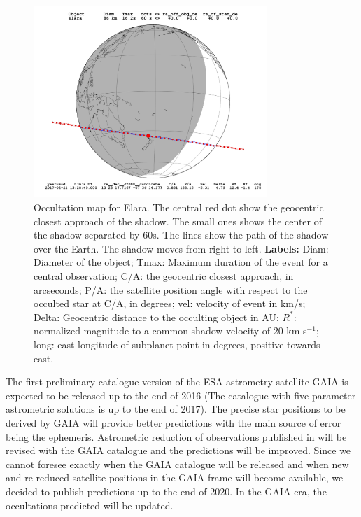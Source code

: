 \documentclass[useAMS,usenatbib]{mn2e}
\begin{document}
\begin{figure}
\begin{centering}
\includegraphics[width = 8.8cm]{figures/Elara_2017-02-21T15:28:40.png}   
\caption{Occultation map for Elara. %
The central red dot show the geocentric closest approach of the shadow. The small ones shows the center of the shadow separated by 60s. The lines show the path of the shadow over the Earth. The shadow moves from right to left.
\textbf{Labels:} Diam: Diameter of the object; Tmax: Maximum duration of the event for a central observation; C/A: the geocentric closest approach, in arcseconds; P/A: the satellite position angle with respect to the occulted star at C/A, in degrees; vel: velocity of event in km/s; Delta: Geocentric distance to the occulting object in AU; $R^*$: normalized magnitude to a common shadow velocity of 20 km s$^{-1}$; long: east longitude of subplanet point in degrees, positive towards east.}
\label{Fig: ocultacao}
\end{centering}
\end{figure}

The first preliminary catalogue version of the ESA astrometry satellite GAIA \citep{deBruijne2012} is expected to be released up to the end of 2016 (The catalogue with five-parameter astrometric solutions is up to the end of 2017). The precise star positions to be derived by GAIA will provide better predictions with the main source of error being the ephemeris. Astrometric reduction of observations published in \cite{GomesJunior2015} will be revised with the GAIA catalogue and the predictions will be improved. Since we cannot foresee exactly when the GAIA catalogue will be released and when new and re-reduced satellite positions in the GAIA frame will become available, we decided to publish predictions up to the end of 2020. In the GAIA era, the occultations predicted will be updated.
\end{document}
